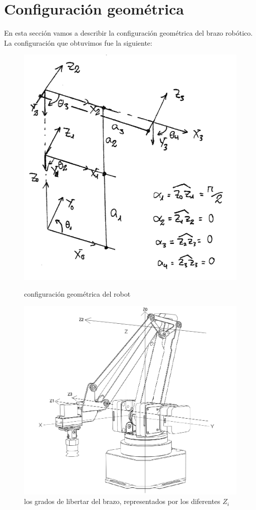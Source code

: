 \documentclass[a4paper,12pt]{article}
\begin{document}
\newpage
\section{Configuración geométrica}

En esta sección vamos a describir la configuración geométrica del brazo robótico. La
configuración que obtuvimos fue la siguiente:
\begin{figure}[H]
    \begin{minipage}{.48\linewidth}
        \centering
        \includegraphics[width=.7\linewidth]{images/geometric_configuration.png}
        \caption{configuración geométrica del robot}
        \label{fig:robot_config}
    \end{minipage}\hfill
    \begin{minipage}{.48\linewidth}
        \centering
        \includegraphics[width=.7\linewidth]{images/axis.png}
        \caption{los grados de libertar del brazo, representados por los diferentes $Z_i$}
        \label{fig:axis}
    \end{minipage}
\end{figure}
\end{document}
